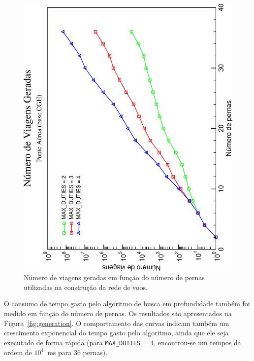 \begin{figure}[htp]
	\begin{center}
		\includegraphics[scale=0.45,angle=-90]{fig/number_of_pairings.eps}
		\caption{Número de viagens geradas em função do número de pernas utilizadas na construção da
		rede de voos.}
		\label{fig:pairings}
	\end{center}
\end{figure}

O consumo de tempo gasto pelo algoritmo de busca em profundidade também foi medido em função do 
número de pernas. Os resultados são apresentados na Figura~\ref{fig:generation}. O comportamento das
curvas indicam também um crescimento exponencial do tempo gasto pelo algoritmo, ainda que ele seja
executado de forma rápida (para \verb|MAX_DUTIES| = 4, encontrou-se um tempos da ordem de $10^4$~ms 
para 36 pernas).

